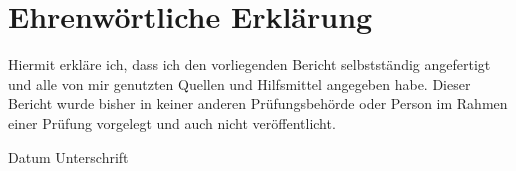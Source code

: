 \chapter*{Ehrenwörtliche Erklärung}

Hiermit erkläre ich, dass ich den vorliegenden Bericht selbstständig angefertigt und alle von mir genutzten Quellen und Hilfsmittel angegeben habe. Dieser Bericht wurde bisher in keiner anderen Prüfungsbehörde oder Person im Rahmen einer Prüfung vorgelegt und auch nicht veröffentlicht.

\vspace{5cm}

Datum \hspace{4cm} Unterschrift\\
